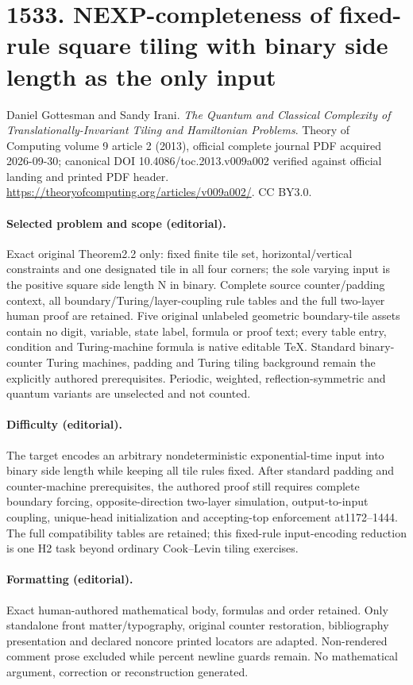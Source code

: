 \documentclass[10pt]{article}
\theoremstyle{definition}
\numberwithin{equation}{section}
\begin{document}
\section*{1533. NEXP-completeness of fixed-rule square tiling with binary side length as the only input}
Daniel Gottesman and Sandy Irani. \emph{The Quantum and Classical Complexity of Translationally-Invariant Tiling and Hamiltonian Problems}. Theory of Computing volume 9 article 2 (2013), official complete journal PDF acquired 2026-09-30; canonical DOI 10.4086/toc.2013.v009a002 verified against official landing and printed PDF header. \url{https://theoryofcomputing.org/articles/v009a002/}. CC BY3.0.
\paragraph{Selected problem and scope (editorial).} Exact original Theorem2.2 only: fixed finite tile set, horizontal/vertical constraints and one designated tile in all four corners; the sole varying input is the positive square side length N in binary. Complete source counter/padding context, all boundary/Turing/layer-coupling rule tables and the full two-layer human proof are retained. Five original unlabeled geometric boundary-tile assets contain no digit, variable, state label, formula or proof text; every table entry, condition and Turing-machine formula is native editable TeX. Standard binary-counter Turing machines, padding and Turing tiling background remain the explicitly authored prerequisites. Periodic, weighted, reflection-symmetric and quantum variants are unselected and not counted.
\paragraph{Difficulty (editorial).} The target encodes an arbitrary nondeterministic exponential-time input into binary side length while keeping all tile rules fixed. After standard padding and counter-machine prerequisites, the authored proof still requires complete boundary forcing, opposite-direction two-layer simulation, output-to-input coupling, unique-head initialization and accepting-top enforcement at1172–1444. The full compatibility tables are retained; this fixed-rule input-encoding reduction is one H2 task beyond ordinary Cook–Levin tiling exercises.
\paragraph{Formatting (editorial).} Exact human-authored mathematical body, formulas and order retained. Only standalone front matter/typography, original counter restoration, bibliography presentation and declared noncore printed locators are adapted. Non-rendered comment prose excluded while percent newline guards remain. No mathematical argument, correction or reconstruction generated.
\clearpage
\setcounter{section}{1}
\end{document}
